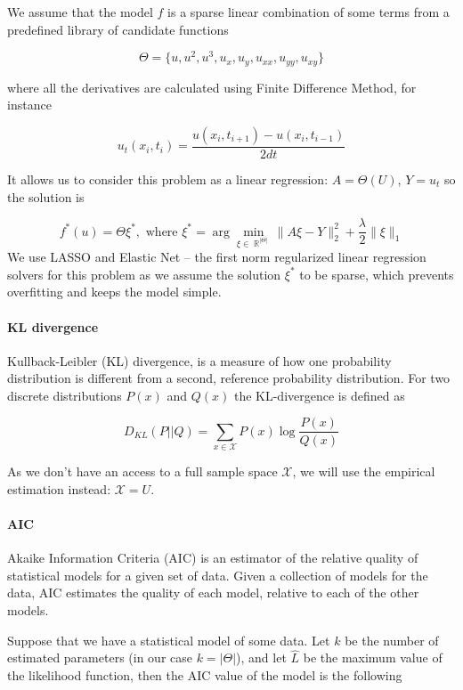 \documentclass{article}
\DeclareMathOperator{\R}{\mathbb{R}}
\begin{document}
    We assume that the model $f$ is a sparse linear combination of some terms from a predefined library of candidate functions
    
    \[
        \Theta = \{u, u^2, u^3, u_x, u_y, u_{xx}, u_{yy}, u_{xy} \}
    \]
    
    where all the derivatives are calculated using Finite Difference Method, for instance
    
    \[
        u_t(x_i, t_i) = \frac{u(x_i, t_{i+1}) - u(x_i, t_{i-1})}{2dt}
    \]
    
    It allows us to consider this problem as a linear regression: $A = \Theta(U)$,  $Y = u_t$ so the solution is
    
    \[
        f^*(u) = \Theta\xi^*, \text{ where } \xi^* = \arg \min_{\xi \in \R^{|\Theta|}} \|A\xi - Y\|_2^2 + \frac{\lambda}{2}\|\xi\|_1
    \]
    We use LASSO and Elastic Net -- the first norm regularized linear regression solvers for this problem as we assume the solution $\xi^*$ to be sparse, which prevents overfitting and keeps the model simple.
    
\paragraph{KL divergence} Kullback-Leibler (KL) divergence, is a measure of how one probability distribution is different from a second, reference probability distribution. For two discrete distributions $P(x)$ and $Q(x)$ the KL-divergence is defined as  

    \[
        D_{KL}(P||Q) = \sum_{x \in \mathcal{X}}P(x)\log{\frac{P(x)}{Q(x)}}
    \]
    
    As we don't have an access to a full sample space $\mathcal{X}$, we will use the empirical estimation instead: $\mathcal{X} = U$.
    
\paragraph{AIC} Akaike Information Criteria (AIC) is an estimator of the relative quality of statistical models for a given set of data. Given a collection of models for the data, AIC estimates the quality of each model, relative to each of the other models. 

Suppose that we have a statistical model of some data. Let $k$ be the number of estimated parameters (in our case $k = |\Theta|$), and let $\hat{L}$ be the maximum value of the likelihood function, then the AIC value of the model is the following
\end{document}
